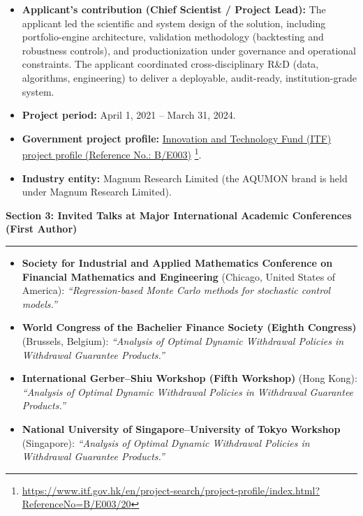 \documentclass[11pt]{article}
\newcommand{\CVSection}[1]{\vspace{6pt}\textbf{\large #1}\par\vspace{2pt}\hrule\vspace{6pt}}
\newenvironment{tightitemize}{%
  \begin{itemize}[leftmargin=*,nosep,topsep=2pt]
}{\end{itemize}}
\begin{document}
\begin{tightitemize}
  \item \textbf{Applicant’s contribution (Chief Scientist / Project Lead):} The applicant led the scientific and system design of the solution, including portfolio-engine architecture, validation methodology (backtesting and robustness controls), and productionization under governance and operational constraints. The applicant coordinated cross-disciplinary R\&D (data, algorithms, engineering) to deliver a deployable, audit-ready, institution-grade system.

  \item \textbf{Project period:} April 1, 2021 -- March 31, 2024.

  \item \textbf{Government project profile:} \href{https://www.itf.gov.hk/en/project-search/project-profile/index.html?ReferenceNo=B/E003/20}{Innovation and Technology Fund (ITF) project profile (Reference No.: B/E003)}%
  \footnote{\url{https://www.itf.gov.hk/en/project-search/project-profile/index.html?ReferenceNo=B/E003/20}}.

  \item \textbf{Industry entity:} Magnum Research Limited (the AQUMON brand is held under Magnum Research Limited).
\end{tightitemize}



\CVSection{Section 3: Invited Talks at Major International Academic Conferences (First Author)}

\begin{tightitemize}
  \item \textbf{Society for Industrial and Applied Mathematics Conference on Financial Mathematics and Engineering} (Chicago, United States of America): \textit{``Regression-based Monte Carlo methods for stochastic control models.''}
  \item \textbf{World Congress of the Bachelier Finance Society (Eighth Congress)} (Brussels, Belgium): \textit{``Analysis of Optimal Dynamic Withdrawal Policies in Withdrawal Guarantee Products.''}
  \item \textbf{International Gerber--Shiu Workshop (Fifth Workshop)} (Hong Kong): \textit{``Analysis of Optimal Dynamic Withdrawal Policies in Withdrawal Guarantee Products.''}
  \item \textbf{National University of Singapore--University of Tokyo Workshop} (Singapore): \textit{``Analysis of Optimal Dynamic Withdrawal Policies in Withdrawal Guarantee Products.''}
\end{tightitemize}
\end{document}
